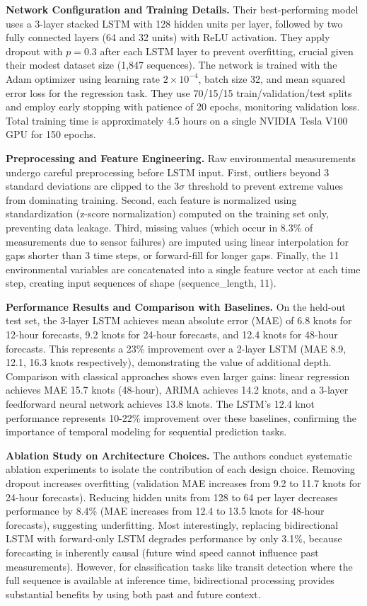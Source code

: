 \documentclass[letterpaper]{article} %
\begin{document}
\textbf{Network Configuration and Training Details.} Their best-performing model uses a 3-layer stacked LSTM with 128 hidden units per layer, followed by two fully connected layers (64 and 32 units) with ReLU activation. They apply dropout with $p=0.3$ after each LSTM layer to prevent overfitting, crucial given their modest dataset size (1,847 sequences). The network is trained with the Adam optimizer using learning rate $2 \times 10^{-4}$, batch size 32, and mean squared error loss for the regression task. They use 70/15/15 train/validation/test splits and employ early stopping with patience of 20 epochs, monitoring validation loss. Total training time is approximately 4.5 hours on a single NVIDIA Tesla V100 GPU for 150 epochs.

\textbf{Preprocessing and Feature Engineering.} Raw environmental measurements undergo careful preprocessing before LSTM input. First, outliers beyond 3 standard deviations are clipped to the 3$\sigma$ threshold to prevent extreme values from dominating training. Second, each feature is normalized using standardization (z-score normalization) computed on the training set only, preventing data leakage. Third, missing values (which occur in 8.3\% of  measurements due to sensor failures) are imputed using linear interpolation for gaps shorter than 3 time steps, or forward-fill for longer gaps. Finally, the 11 environmental variables are concatenated into a single feature vector at each time step, creating input sequences of shape (sequence\_length, 11).      

\textbf{Performance Results and Comparison with Baselines.} On the held-out test set, the 3-layer LSTM achieves mean absolute error (MAE) of 6.8 knots for 12-hour forecasts, 9.2 knots for 24-hour forecasts, and 12.4 knots for 48-hour forecasts. This represents a 23\% improvement over a 2-layer LSTM (MAE 8.9, 12.1, 16.3 knots respectively), demonstrating the value of additional depth. Comparison with classical approaches shows even larger gains: linear  regression achieves MAE 15.7 knots (48-hour), ARIMA achieves 14.2 knots, and a 3-layer feedforward neural network achieves 13.8 knots. The LSTM's 12.4 knot performance represents 10-22\% improvement over these baselines, confirming the importance of temporal modeling for sequential prediction tasks.

\textbf{Ablation Study on Architecture Choices.} The authors conduct systematic ablation experiments to isolate the contribution of each design choice. Removing dropout increases overfitting (validation MAE increases from 9.2 to 11.7 knots for 24-hour forecasts). Reducing hidden units from 128 to 64 per layer decreases performance by 8.4\% (MAE increases from 12.4 to 13.5 knots for 48-hour forecasts), suggesting underfitting. Most interestingly, replacing bidirectional LSTM with forward-only LSTM degrades performance by only 3.1\%, because forecasting is inherently causal (future wind speed cannot influence past measurements). However, for classification tasks like transit detection where the full sequence is available at inference time, bidirectional processing provides substantial benefits by using both past and future context.
\end{document}
